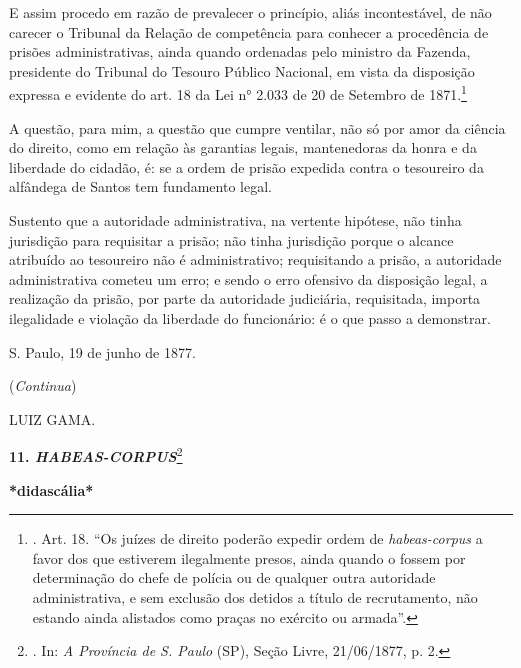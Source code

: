 E assim procedo em razão de prevalecer o princípio, aliás incontestável,
de não carecer o Tribunal da Relação de competência para conhecer a
procedência de prisões administrativas, ainda quando ordenadas pelo
ministro da Fazenda, presidente do Tribunal do Tesouro Público Nacional,
em vista da disposição expressa e evidente do art. 18 da Lei n° 2.033 de
20 de Setembro de 1871.\footnote{. Art. 18. ``Os juízes de direito
  poderão expedir ordem de \emph{habeas-corpus} a favor dos que
  estiverem ilegalmente presos, ainda quando o fossem por determinação
  do chefe de polícia ou de qualquer outra autoridade administrativa, e
  sem exclusão dos detidos a título de recrutamento, não estando ainda
  alistados como praças no exército ou armada''.}

\protect\hypertarget{Secao_Sem_Titulo-16}{}{}A questão, para mim, a
questão que cumpre ventilar, não só por amor da ciência do direito, como
em relação às garantias legais, mantenedoras da honra e da liberdade do
cidadão, é: se a ordem de prisão expedida contra o tesoureiro da
alfândega de Santos tem fundamento legal.

Sustento que a autoridade administrativa, na vertente hipótese, não
tinha jurisdição para requisitar a prisão; não tinha jurisdição porque o
alcance atribuído ao tesoureiro não é administrativo; requisitando a
prisão, a autoridade administrativa cometeu um erro; e sendo o erro
ofensivo da disposição legal, a realização da prisão, por parte da
autoridade judiciária, requisitada, importa ilegalidade e violação da
liberdade do funcionário: é o que passo a demonstrar.

S. Paulo, 19 de junho de 1877.

(\emph{Continua})

LUIZ GAMA.

\textbf{11. \emph{HABEAS-CORPUS}}\footnote{. In: \emph{A Província de S.
  Paulo} (SP), Seção Livre, 21/06/1877, p. 2.}

\textbf{*didascália*}

